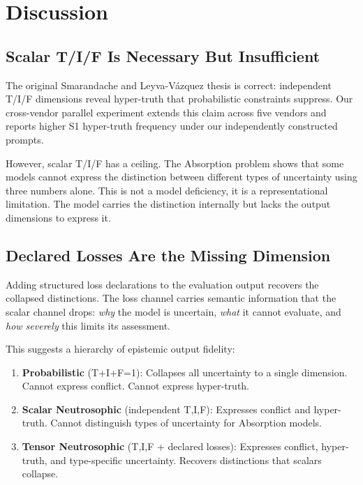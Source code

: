 \section{Discussion}

\subsection{Scalar T/I/F Is Necessary But Insufficient}

The original Smarandache and Leyva-Vázquez thesis is correct:
independent T/I/F dimensions reveal hyper-truth that probabilistic
constraints suppress. Our cross-vendor parallel experiment extends this
claim across five vendors and reports higher S1 hyper-truth frequency
under our independently constructed prompts.

However, scalar T/I/F has a ceiling. The Absorption problem shows that
some models cannot express the distinction between different types of
uncertainty using three numbers alone. This is not a model deficiency,
it is a representational limitation. The model carries the distinction
internally but lacks the output dimensions to express it.

\subsection{Declared Losses Are the Missing Dimension}

Adding structured loss declarations to the evaluation output recovers
the collapsed distinctions. The loss channel carries semantic
information that the scalar channel drops: \emph{why} the model is
uncertain, \emph{what} it cannot evaluate, and \emph{how severely} this
limits its assessment.

This suggests a hierarchy of epistemic output fidelity:

\begin{enumerate}
\def\labelenumi{\arabic{enumi}.}
\tightlist
\item
  \textbf{Probabilistic} (T+I+F=1): Collapses all uncertainty to a
  single dimension. Cannot express conflict. Cannot express hyper-truth.
\item
  \textbf{Scalar Neutrosophic} (independent T,I,F): Expresses conflict
  and hyper-truth. Cannot distinguish types of uncertainty for
  Absorption models.
\item
  \textbf{Tensor Neutrosophic} (T,I,F + declared losses): Expresses
  conflict, hyper-truth, and type-specific uncertainty. Recovers
  distinctions that scalars collapse.
\end{enumerate}

